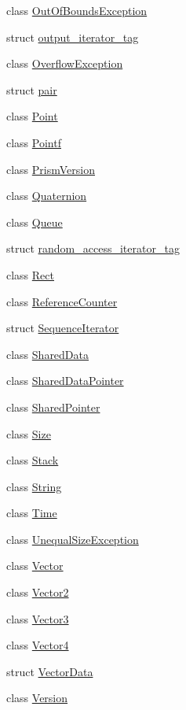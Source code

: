 \begin{DoxyCompactItemize}
class \hyperlink{classprism_1_1_out_of_bounds_exception}{Out\+Of\+Bounds\+Exception}
\item 
struct \hyperlink{structprism_1_1output__iterator__tag}{output\+\_\+iterator\+\_\+tag}
\item 
class \hyperlink{classprism_1_1_overflow_exception}{Overflow\+Exception}
\item 
struct \hyperlink{structprism_1_1pair}{pair}
\item 
class \hyperlink{classprism_1_1_point}{Point}
\item 
class \hyperlink{classprism_1_1_pointf}{Pointf}
\item 
class \hyperlink{classprism_1_1_prism_version}{Prism\+Version}
\item 
class \hyperlink{classprism_1_1_quaternion}{Quaternion}
\item 
class \hyperlink{classprism_1_1_queue}{Queue}
\item 
struct \hyperlink{structprism_1_1random__access__iterator__tag}{random\+\_\+access\+\_\+iterator\+\_\+tag}
\item 
class \hyperlink{classprism_1_1_rect}{Rect}
\item 
class \hyperlink{classprism_1_1_reference_counter}{Reference\+Counter}
\item 
struct \hyperlink{structprism_1_1_sequence_iterator}{Sequence\+Iterator}
\item 
class \hyperlink{classprism_1_1_shared_data}{Shared\+Data}
\item 
class \hyperlink{classprism_1_1_shared_data_pointer}{Shared\+Data\+Pointer}
\item 
class \hyperlink{classprism_1_1_shared_pointer}{Shared\+Pointer}
\item 
class \hyperlink{classprism_1_1_size}{Size}
\item 
class \hyperlink{classprism_1_1_stack}{Stack}
\item 
class \hyperlink{classprism_1_1_string}{String}
\item 
class \hyperlink{classprism_1_1_time}{Time}
\item 
class \hyperlink{classprism_1_1_unequal_size_exception}{Unequal\+Size\+Exception}
\item 
class \hyperlink{classprism_1_1_vector}{Vector}
\item 
class \hyperlink{classprism_1_1_vector2}{Vector2}
\item 
class \hyperlink{classprism_1_1_vector3}{Vector3}
\item 
class \hyperlink{classprism_1_1_vector4}{Vector4}
\item 
struct \hyperlink{structprism_1_1_vector_data}{Vector\+Data}
\item 
class \hyperlink{classprism_1_1_version}{Version}
\end{DoxyCompactItemize}
